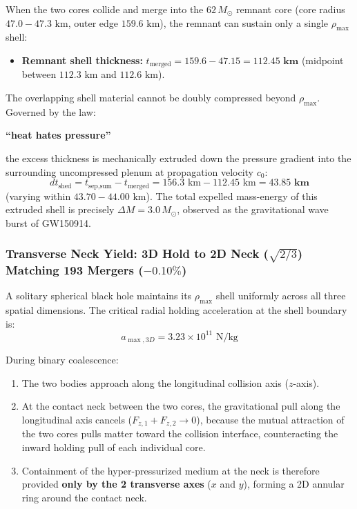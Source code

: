 \documentclass[11pt,a4paper]{article}
\begin{document}
When the two cores collide and merge into the $62\,M_\odot$ remnant core (core radius $47.0 - 47.3\text{ km}$, outer edge $159.6\text{ km}$), the remnant can sustain only a single $\rho_{\max}$ shell:
\begin{itemize}
    \item \textbf{Remnant shell thickness:} $t_{\text{merged}} = 159.6 - 47.15 = \mathbf{112.45\text{ km}}$ (midpoint between $112.3\text{ km}$ and $112.6\text{ km}$).
\end{itemize}

The overlapping shell material cannot be doubly compressed beyond $\rho_{\max}$. Governed by the law:
\begin{center}
\textbf{``heat hates pressure''}
\end{center}
the excess thickness is mechanically extruded down the pressure gradient into the surrounding uncompressed plenum at propagation velocity $c_0$:
\begin{equation}
dt_{\text{shed}} = t_{\text{sep,sum}} - t_{\text{merged}} = 156.3\text{ km} - 112.45\text{ km} = \mathbf{43.85\text{ km}}
\label{eq:dt_shed_val}
\end{equation}
(varying within $43.70 - 44.00\text{ km}$). The total expelled mass-energy of this extruded shell is precisely $\Delta M = 3.0\,M_\odot$, observed as the gravitational wave burst of GW150914.

\subsubsection{Transverse Neck Yield: 3D Hold to 2D Neck ($\sqrt{2/3}$) Matching 193 Mergers ($-0.10\%$)}
\label{subsubsec:neck_yield_proof}

A solitary spherical black hole maintains its $\rho_{\max}$ shell uniformly across all three spatial dimensions. The critical radial holding acceleration at the shell boundary is:
\begin{equation}
a_{\max,3D} = 3.23 \times 10^{11}\text{ N/kg}
\end{equation}

During binary coalescence:
\begin{enumerate}
    \item The two bodies approach along the longitudinal collision axis ($z$-axis).
    \item At the contact neck between the two cores, the gravitational pull along the longitudinal axis cancels ($F_{z,1} + F_{z,2} \to 0$), because the mutual attraction of the two cores pulls matter toward the collision interface, counteracting the inward holding pull of each individual core.
    \item Containment of the hyper-pressurized medium at the neck is therefore provided \textbf{only by the 2 transverse axes} ($x$ and $y$), forming a 2D annular ring around the contact neck.
\end{enumerate}
\end{document}
